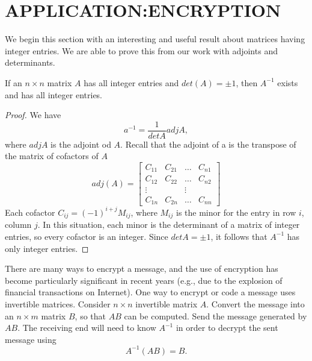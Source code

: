 \documentclass[../main.tex]{subfiles}
\begin{document}
\section{APPLICATION:ENCRYPTION} \label{sec:4_4}
\noindent We begin this section with an interesting and useful result about matrices having integer entries. We are able to prove this from our work with adjoints and determinants.

\begin{theorem} \label{th:4_7}
  If an \(n \times n\) matrix \(A\) has all integer entries and \(det(A) = \pm1\), then \(A^{-1}\) exists and has all integer entries.
\end{theorem}
\begin{proof}
  We have
  \begin{equation*}
    a^{-1} = \frac{1}{detA}adjA,
  \end{equation*}
  where \(adjA\) is the adjoint od \(A\). Recall that the adjoint of a is the transpose of the matrix of cofactors of \(A\)
  \begin{equation*}
    adj(A) = \begin{bmatrix}
      C_{11} & C_{21} & \ldots & C_{n1}\\
      C_{12} & C_{22} & \ldots & C_{n2}\\
      \vdots & & \vdots\\
      C_{1n} & C_{2n} & \ldots & C_{nn}
    \end{bmatrix}
  \end{equation*}
  Each cofactor \(C_{ij}=(-1)^{i+j}M_{ij}\), where \(M_{ij}\) is the minor for the entry in row \(i\), column \(j\). In this situation, each minor is the determinant of a matrix of integer entries, so every cofactor is an integer. Since \(detA = \pm1\), it follows that \(A^{-1}\) has only integer entries.
\end{proof}

There are many ways to encrypt a message, and the use of encryption has become particularly significant in recent years (e.g., due to the explosion of financial transactions on Internet). One way to encrypt or code a message uses invertible matrices. Consider \(n \times n\) invertible matrix \(A\). Convert the message into an \(n \times m\) matrix \(B\), so that \(AB\) can be computed.
Send the message generated by \(AB\). The  receiving end will need to know \(A^{-1}\) in order to decrypt the sent message using
\begin{equation*}
  A^{-1}(AB) = B.
\end{equation*}
\end{document}
